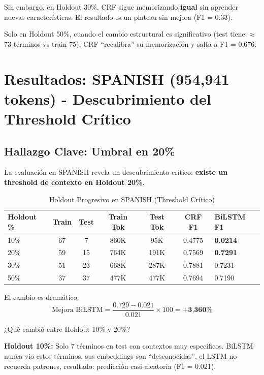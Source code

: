 Sin embargo, en Holdout 30\%, CRF sigue memorizando \textbf{igual} sin aprender nuevas características. El resultado es un plateau sin mejora (F1 = 0.33).

Solo en Holdout 50\%, cuando el cambio estructural es significativo (test tiene $\approx$73 términos vs train 75), CRF ``recalibra'' su memorización y salta a F1 = 0.676.

\section{Resultados: SPANISH (954,941 tokens) - Descubrimiento del Threshold Crítico}

\subsection{Hallazgo Clave: Umbral en 20\%}

La evaluación en SPANISH revela un descubrimiento crítico: \textbf{existe un threshold de contexto en Holdout 20\%}.

\begin{table}[H]
\centering
\caption{Holdout Progresivo en SPANISH (Threshold Crítico)}
\label{tab:holdout_es}
\begin{tabular}{lcccccl}
\toprule
\textbf{Holdout \%} & \textbf{Train} & \textbf{Test} & \textbf{Train Tok} & \textbf{Test Tok} & \textbf{CRF F1} & \textbf{BiLSTM F1} \\
\midrule
10\% & 67 & 7 & 860K & 95K & 0.4775 & \textbf{0.0214} \\
20\% & 59 & 15 & 764K & 191K & 0.7569 & \textbf{0.7291} \\
30\% & 51 & 23 & 668K & 287K & 0.7881 & 0.7231 \\
50\% & 37 & 37 & 477K & 477K & 0.7694 & 0.7190 \\
\bottomrule
\end{tabular}
\end{table}

El cambio es dramático:
\begin{equation}
\text{Mejora BiLSTM} = \frac{0.729 - 0.021}{0.021} \times 100 = \textbf{+3,360\%}
\end{equation}

¿Qué cambió entre Holdout 10\% y 20\%?

\textbf{Holdout 10\%:} Solo 7 términos en test con contextos muy específicos. BiLSTM nunca vio estos términos, sus embeddings son ``desconocidas'', el LSTM no recuerda patrones, resultado: predicción casi aleatoria (F1 = 0.021).

